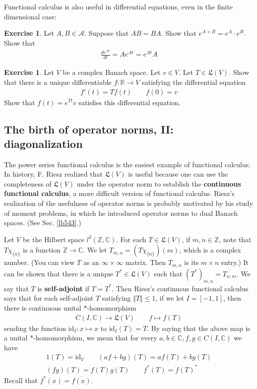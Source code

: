 \documentclass[12pt,b5paper,notitlepage]{article}
\theoremstyle{definition}
\newtheorem{exe}[df]{Exercise}
\theoremstyle{plain}
\newcommand{\fk}{\mathfrak}
\newcommand{\ovl}{\overline}
\newcommand{\id}{\mathrm{id}}
\newcommand{\scr}{\mathscr}
\newcommand{\Cbb}{\mathbb C}
\newcommand{\Zbb}{\mathbb Z}
\newcommand{\Rbb}{\mathbb R}
\numberwithin{equation}{section}
\begin{document}
Functional calculus is also useful in differential equations, even in the finite dimensional case:


\begin{exe}
Let $A,B\in\scr A$.  Suppose that $AB=BA$. Show that $e^{A+B}=e^A\cdot e^B$. Show that
\begin{align*}
\frac {d e^{At}}{dt}=Ae^{At}=e^{At}A
\end{align*}
\end{exe}

\begin{exe}
Let $V$ be a complex Banach space. Let $v\in V$. Let $T\in\fk L(V)$. Show that there is a unique differentiable $f:\Rbb\rightarrow V$ satisfying the differential equation
\begin{align*}
f'(t)=Tf(t)\qquad f(0)=v
\end{align*}
Show that $f(t)=e^{Tt}v$ satisfies this differential equation.
\end{exe}


\subsection{The birth of operator norms, II: diagonalization}\label{lb551}




The power series functional calculus is the easiest example of functional calculus. In history, F. Riesz realized that $\fk L(V)$ is useful because one can use the completeness of $\fk L(V)$ under the operator norm to establish the \textbf{continuous functional calculus}, a more difficult version of functional calculus. Riesz's realization of the usefulness of operator norms is probably motivated by his study of moment problems, in which he introduced operator norms to dual Banach spaces. (See Sec. \ref{lb543}.)

Let $V$ be the Hilbert space $l^2(\Zbb,\Cbb)$. For each $T\in\fk L(V)$, if $m,n\in\Zbb$, note that $T\chi_{\{n\}}$ is a function $\Zbb\rightarrow\Cbb$. We let $T_{m,n}=(T\chi_{\{n\}})(m)$, which is a complex number. (You can view $T$ as an $\infty\times\infty$ matrix. Then $T_{m,n}$ is its $m\times n$ entry.) It can be shown that there is a unique $T^*\in\fk L(V)$ such that $(T^*)_{m,n}=\ovl{T_{n,m}}$. We say that $T$ is \textbf{self-adjoint} if $T=T^*$. Then Riesz's continuous functional calculus says that for each self-adjoint $T$ satisfying $\Vert T\Vert\leq 1$, if we let $I=[-1,1]$, then there is continuous unital $*$-homomorphism
\begin{align*}
C(I,\Cbb)\rightarrow \fk L(V)\qquad f\mapsto f(T)
\end{align*}
sending the function $\id_I:x\mapsto x$ to $\id_I(T)=T$. By saying that the above map is a unital $*$-homomorphism, we mean that for every $a,b\in\Cbb,f,g\in C(I,\Cbb)$ we have
\begin{gather*}
1(T)=\id_V\qquad (af+bg)(T)=af(T)+bg(T)\\
(fg)(T)=f(T)g(T)\qquad f^*(T)=f(T)^*
\end{gather*}
Recall that $f^*(x)=\ovl {f(x)}$. 
\end{document}

